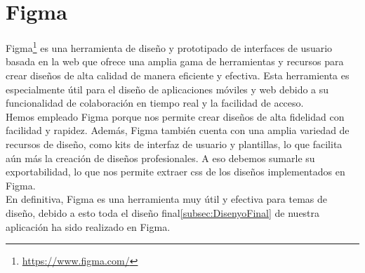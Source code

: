 \section{Figma}\label{sec:Figma}
Figma\footnote{\url{https://www.figma.com/}} es una herramienta de diseño y prototipado de interfaces de usuario basada en la web que ofrece una amplia gama de herramientas y recursos para crear diseños de alta calidad de manera eficiente y efectiva. Esta herramienta es especialmente útil para el diseño de aplicaciones móviles y web debido a su funcionalidad de colaboración en tiempo real y la facilidad de acceso.
\\
Hemos empleado Figma porque nos permite crear diseños de alta fidelidad con facilidad y rapidez. Además, Figma también cuenta con una amplia variedad de recursos de diseño, como kits de interfaz de usuario y plantillas, lo que facilita aún más la creación de diseños profesionales. A eso debemos sumarle su exportabilidad, lo que nos permite extraer css de los diseños implementados en Figma.
\\
En definitiva, Figma es una herramienta muy útil y efectiva para temas de diseño, debido a esto toda el diseño final\ref{subsec:DisenyoFinal} de nuestra aplicación ha sido realizado en Figma.

